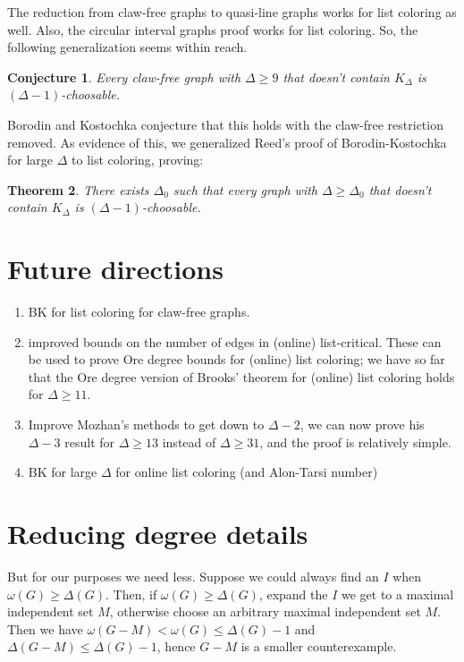 \documentclass[12pt]{article}
\theoremstyle{plain}
\newtheorem{thm}{Theorem}[section]
\newtheorem{conjecture}[thm]{Conjecture}
\theoremstyle{definition}
\theoremstyle{remark}
\begin{document}


The reduction from claw-free graphs to quasi-line graphs works for list coloring as well.  Also, the circular interval graphs proof works for list coloring.  So, the following generalization seems within reach.

\begin{conjecture}
Every claw-free graph with $\Delta \geq 9$ that doesn't contain $K_{\Delta}$ is $(\Delta-1)$-choosable.
\end{conjecture}

Borodin and Kostochka conjecture that this holds with the claw-free restriction removed.  As evidence of this, we generalized Reed's proof of Borodin-Kostochka for large $\Delta$ to list coloring, proving:

\begin{thm}
There exists $\Delta_0$ such that every graph with $\Delta \geq \Delta_0$ that doesn't contain $K_{\Delta}$ is $(\Delta-1)$-choosable.
\end{thm}

\section{Future directions}
\begin{enumerate}
\item BK for list coloring for claw-free graphs.
\item improved bounds on the number of edges in (online) list-critical.  These can be used to prove Ore degree bounds for (online) list coloring; we have so far that the Ore degree version of Brooks' theorem for (online) list coloring holds for $\Delta \geq 11$.
\item Improve Mozhan's methods to get down to $\Delta-2$, we can now prove his $\Delta-3$ result for $\Delta \geq 13$ instead of $\Delta \geq 31$, and the proof is relatively simple.
\item BK for large $\Delta$ for online list coloring (and Alon-Tarsi number)
\end{enumerate}

\section{Reducing degree details}

\bigskip

But for our purposes we need less.  Suppose we could always find an $I$ when $\omega(G) \geq \Delta(G)$.  Then, if $\omega(G) \geq \Delta(G)$, expand the $I$ we get to a maximal independent set $M$, otherwise choose an arbitrary maximal independent set $M$.  Then we have $\omega(G-M) < \omega(G) \leq \Delta(G) - 1$ and $\Delta(G-M) \leq \Delta(G) - 1$,  hence $G-M$ is a smaller counterexample.
\end{document}
